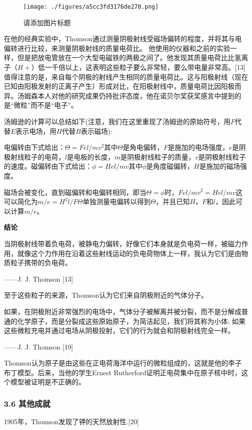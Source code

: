\begin{figure}[ht]
\centering
\texttt{[image: ./figures/a5cc3fd3176de270.png]}
\caption{请添加图片标题} \label{fig_Joseph_5}
\end{figure}
在他的经典实验中，Thomson通过测量阴极射线受磁场偏转的程度，并将其与电偏转进行比较，来测量阴极射线的质量电荷比。 他使用的仪器和之前的实验一样，但是把放电管放在一个大型电磁铁的两极之间了。他发现其质量电荷比比氢离子（$H+$）低一千倍以上，这表明这些粒子要么非常轻，要么带电量非常高。[13] 值得注意的是，来自每个阴极的射线产生相同的质量电荷比。这与阳极射线（现在已知由阳极发射的正离子产生）形成对比，在阳极射线中，质量电荷比因阳极而异。汤姆森本人对他的研究成果仍持批评态度，他在诺贝尔奖获奖感言中提到的是“微粒”而不是“电子”。

汤姆逊的计算可以总结如下(注意，我们在这里重现了汤姆逊的原始符号，用$F$代替$E$表示电场，用$H$代替$B$表示磁场):

电偏转由下式给出：$\Theta = Fel/mv^2$其中$\Theta$是角电偏转，$F$是施加的电场强度，$e$是阴极射线粒子的电荷，$l$是电板的长度，$m$是阴极射线粒子的质量，$v$是阴极射线粒子的速度。磁偏转由下式给出：$\phi = Hel/mv$其中$\phi$是角度磁偏转，$H$是施加的磁场强度。

磁场会被变化，直到磁偏转和电偏转相同，即当$\Theta = \phi$时，$Fel/mv^2 = Hel/mv$这可以简化为$m/e = H^2 l/F \Theta$单独测量电偏转以得到$\Theta$，并且已知$H$，$F$和$l$，因此可以计算$m / e$。

\textbf{结论}

当阴极射线带着负电荷，被静电力偏转，好像它们本身就是负电荷一样，被磁力作用，就像这个力作用在沿着这些射线运动的负电荷物体上一样，我认为它们是由物质粒子携带的负电荷。

——J. J. Thomson [13]

至于这些粒子的来源，Thomson认为它们来自阴极附近的气体分子。

如果，在阴极附近非常强烈的电场中，气体分子被解离并被分裂，而不是分解成普通的化学原子，而是分裂成这些原始原子，为简洁起见，我们将其称为小体; 如果这些微粒充电并通过电场从阴极投射，它们的行为就会和阴极射线完全一样。

——J. J. Thomson [19]

Thomson认为原子是由这些在正电荷海洋中运行的微粒组成的，这就是他的李子布丁模型。后来，当他的学生Ernest Rutherford证明正电荷集中在原子核中时，这个模型被证明是不正确的。

\subsubsection{3.6 其他成就}
1905年，Thomson发现了钾的天然放射性.[20]

